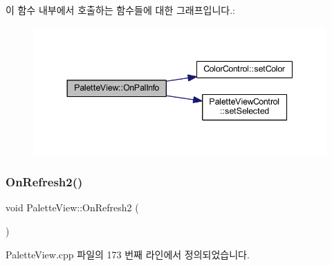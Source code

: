 이 함수 내부에서 호출하는 함수들에 대한 그래프입니다.\+:
\nopagebreak
\begin{figure}[H]
\begin{center}
\leavevmode
\includegraphics[width=344pt]{class_palette_view_a458786a4c3317411b5cd818c544ea50a_cgraph}
\end{center}
\end{figure}
\mbox{\label{class_palette_view_ae5eaa6866be56bc87f8fe73033947c7d}} 
\subsubsection{\texorpdfstring{On\+Refresh2()}{OnRefresh2()}}
{\footnotesize\ttfamily void Palette\+View\+::\+On\+Refresh2 (\begin{DoxyParamCaption}{ }\end{DoxyParamCaption})\hspace{0.3cm}{\ttfamily [protected]}}



Palette\+View.\+cpp 파일의 173 번째 라인에서 정의되었습니다.


